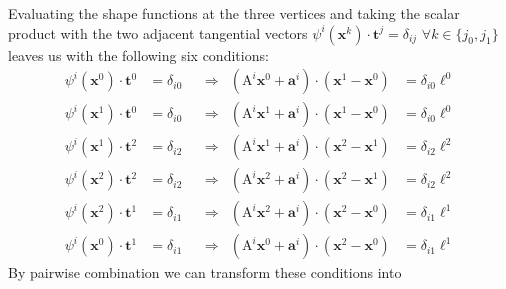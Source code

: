 \documentclass{scrartcl}
\begin{document}
Evaluating the shape functions at the three vertices and taking the scalar
product with the two adjacent tangential vectors $\psi^i(\mathbf
x^k)\cdot\mathbf t^j=\delta_{ij}$ $\forall k\in\{j_0,j_1\}$ leaves us with
the following six conditions:
\begin{subequations}
  \begin{align}
    \psi^i(\mathbf x^0)\cdot\mathbf t^0&=\delta_{i0} &&\Longrightarrow &
        (\mathrm A^i\mathbf x^0+\mathbf a^i)
        \cdot(\mathbf x^1-\mathbf x^0)&=\delta_{i0}\ell^0              \\
    \psi^i(\mathbf x^1)\cdot\mathbf t^0&=\delta_{i0} &&\Longrightarrow &
        (\mathrm A^i\mathbf x^1+\mathbf a^i)
        \cdot(\mathbf x^1-\mathbf x^0)&=\delta_{i0}\ell^0              \\
    \psi^i(\mathbf x^1)\cdot\mathbf t^2&=\delta_{i2} &&\Longrightarrow &
        (\mathrm A^i\mathbf x^1+\mathbf a^i)
        \cdot(\mathbf x^2-\mathbf x^1)&=\delta_{i2}\ell^2              \\
    \psi^i(\mathbf x^2)\cdot\mathbf t^2&=\delta_{i2} &&\Longrightarrow &
        (\mathrm A^i\mathbf x^2+\mathbf a^i)
        \cdot(\mathbf x^2-\mathbf x^1)&=\delta_{i2}\ell^2              \\
    \psi^i(\mathbf x^2)\cdot\mathbf t^1&=\delta_{i1} &&\Longrightarrow &
        (\mathrm A^i\mathbf x^2+\mathbf a^i)
        \cdot(\mathbf x^2-\mathbf x^0)&=\delta_{i1}\ell^1              \\
    \psi^i(\mathbf x^0)\cdot\mathbf t^1&=\delta_{i1} &&\Longrightarrow &
        (\mathrm A^i\mathbf x^0+\mathbf a^i)
        \cdot(\mathbf x^2-\mathbf x^0)&=\delta_{i1}\ell^1
  \end{align}
\end{subequations}
By pairwise combination we can transform these conditions into
\end{document}
